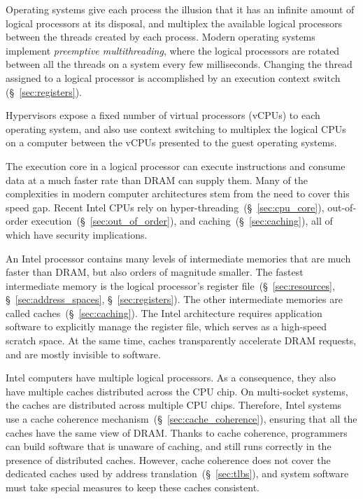 Operating systems give each process the illusion that it has an infinite amount
of logical processors at its disposal, and multiplex the available logical
processors between the threads created by each process. Modern operating
systems implement \textit{preemptive multithreading}, where the logical
processors are rotated between all the threads on a system every few
milliseconds. Changing the thread assigned to a logical processor is
accomplished by an execution context switch (\S~\ref{sec:registers}).

Hypervisors expose a fixed number of virtual processors (vCPUs) to each
operating system, and also use context switching to multiplex the logical CPUs
on a computer between the vCPUs presented to the guest operating systems.

The execution core in a logical processor can execute instructions and consume
data at a much faster rate than DRAM can supply them. Many of the complexities
in modern computer architectures stem from the need to cover this speed gap.
Recent Intel CPUs rely on hyper-threading~(\S~\ref{sec:cpu_core}),
out-of-order execution~(\S~\ref{sec:out_of_order}), and
caching~(\S~\ref{sec:caching}), all of which have security implications.

An Intel processor contains many levels of intermediate memories that are much
faster than DRAM, but also orders of magnitude smaller.  The fastest
intermediate memory is the logical processor's register
file~(\S~\ref{sec:resources}, \S~\ref{sec:address_spaces},
\S~\ref{sec:registers}). The other intermediate memories are called
caches~(\S~\ref{sec:caching}). The Intel architecture requires application
software to explicitly manage the register file, which serves as a high-speed
scratch space. At the same time, caches transparently accelerate DRAM requests,
and are mostly invisible to software.

Intel computers have multiple logical processors. As a consequence, they also
have multiple caches distributed across the CPU chip. On multi-socket systems,
the caches are distributed across multiple CPU chips. Therefore, Intel systems
use a cache coherence mechanism~(\S~\ref{sec:cache_coherence}), ensuring that
all the caches have the same view of DRAM. Thanks to cache coherence,
programmers can build software that is unaware of caching, and still runs
correctly in the presence of distributed caches. However, cache coherence does
not cover the dedicated caches used by address translation~(\S~\ref{sec:tlbs}),
and system software must take special measures to keep these caches consistent.

